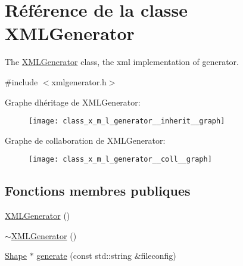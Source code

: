 \hypertarget{class_x_m_l_generator}{}\section{Référence de la classe X\+M\+L\+Generator}
\label{class_x_m_l_generator}


The \hyperlink{class_x_m_l_generator}{X\+M\+L\+Generator} class, the xml implementation of generator.  




{\ttfamily \#include $<$xmlgenerator.\+h$>$}



Graphe d\textquotesingle{}héritage de X\+M\+L\+Generator\+:
\nopagebreak
\begin{figure}[H]
\begin{center}
\leavevmode
\texttt{[image: class\_x\_m\_l\_generator\_\_inherit\_\_graph]}
\end{center}
\end{figure}


Graphe de collaboration de X\+M\+L\+Generator\+:
\nopagebreak
\begin{figure}[H]
\begin{center}
\leavevmode
\texttt{[image: class\_x\_m\_l\_generator\_\_coll\_\_graph]}
\end{center}
\end{figure}
\subsection*{Fonctions membres publiques}
\begin{DoxyCompactItemize}
\item 
\hyperlink{class_x_m_l_generator_ae88722c986a3d984f0050be10d69e6aa}{X\+M\+L\+Generator} ()
\item 
\hyperlink{class_x_m_l_generator_a8f947bac9f682ba5a22ccb98ff88ff81}{$\sim$\+X\+M\+L\+Generator} ()
\item 
\hyperlink{class_shape}{Shape} $\ast$ \hyperlink{class_x_m_l_generator_adf874b492da2e813980151c3453dd75c}{generate} (const std\+::string \&fileconfig)
\end{DoxyCompactItemize}
